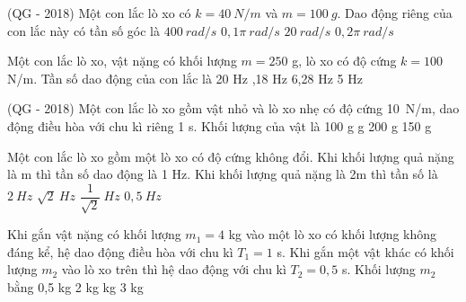 \begin{ex} %
(QG - 2018) Một con lắc lò xo có $k = 40\ N/m$ và $m = 100\ g$. Dao động riêng của con lắc này có tần số góc là
\choice
{$400\ rad/s$}
{$0,1\pi\ rad/s$}
{\True $20\ rad/s$}
{$0,2\pi\ rad/s$}
\end{ex} 

\begin{ex}%
Một con lắc lò xo, vật nặng có khối lượng $m = 250$ g, lò xo có độ cứng $k = 100$ N/m. Tần số dao động của con lắc là
\choice
{20 Hz}
{,18 Hz}
{6,28 Hz}
{5 Hz}
\end{ex} 
\begin{ex} %
(QG - 2018) Một con lắc lò xo gồm vật nhỏ và lò xo nhẹ có độ cứng 10\ N/m, dao động điều hòa với chu kì riêng 1 s. Khối lượng của vật là
\choice
{100 g}
{ g}
{200 g}
{150 g}

\end{ex} 

\begin{ex}
Một con lắc lò xo gồm một lò xo có độ cứng không đổi. Khi khối lượng quả nặng là m thì tần số dao động là 1 Hz. Khi khối lượng quả nặng là 2m thì tần số là
\choice
{$2\ Hz$}
{$\sqrt 2\ Hz$}
{\True $\dfrac{1}{\sqrt 2}\ Hz$}
{$0,5\ Hz$}

\end{ex} 
\begin{ex}%
Khi gắn vật nặng có khối lượng $m_1 = 4$ kg vào một lò xo có khối lượng không đáng kể, hệ dao động điều hòa với chu kì $T_1 = 1$ s. Khi gắn một vật khác có khối lượng $m_{2}$ vào lò xo trên thì hệ dao động với chu kì $T_2 = 0,5$ s. Khối lượng $m_2$ bằng
\choice
{0,5 kg}
{2 kg}
{ kg}
{3 kg}
\end{ex} 

